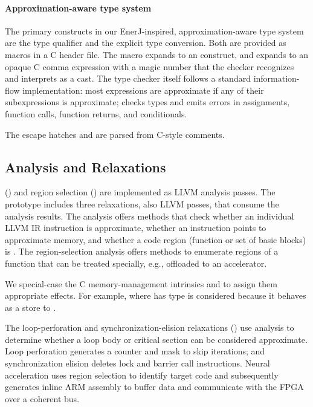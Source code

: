 \paragraph{Approximation-aware type system}

The primary constructs in our EnerJ-inspired, approximation-aware type system
are the  type qualifier and the  explicit type
conversion. Both are provided as macros in a C header file. The
 macro expands to an  construct,
and  expands to an opaque C comma expression with a magic
number that the checker recognizes and interprets as a cast.
The type checker itself follows a standard information-flow implementation:
most expressions are approximate if any of their subexpressions is
approximate; \sysname checks types and emits errors in assignments, function
calls, function returns, and conditionals.

The escape hatches \annpermit and \annforbid are parsed from
C-style comments.

\subsection{Analysis and Relaxations}

\Precisepurity () and region selection
() are implemented as LLVM analysis passes. The \sysname
prototype includes three relaxations, also LLVM passes, that
consume the analysis results.
%
The \precisepurity analysis offers methods that check whether an individual LLVM
IR instruction is approximate, whether an instruction points to approximate
memory, and whether a code region (function or set of basic blocks) is \precisepure.
%
The region-selection analysis offers methods to enumerate \precisepure regions
of a function that can be treated specially, e.g., offloaded to an accelerator.

We special-case
the C memory-management intrinsics  and 
to assign them appropriate effects.
For example,  where  has type
 is
considered \precisepure because it behaves as a store to .

The loop-perforation and synchronization-elision relaxations
() use \precisepurity analysis to determine whether
a loop body or critical section can be considered approximate.
Loop perforation generates a counter and mask to skip iterations;
and synchronization elision deletes lock and barrier call instructions.
Neural acceleration uses region selection to identify target code and
subsequently generates inline ARM assembly to buffer data and communicate
with the FPGA over a coherent bus.

